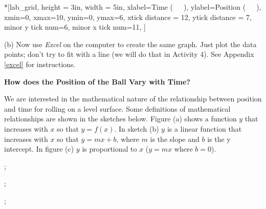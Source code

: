 \begin{lab_axis}*[lab_grid,
	height = {3in},
	width = {5in},
	xlabel={Time (~~~)},
	ylabel={Position (~~~)},
	xmin=0, xmax=10,
	ymin=0, ymax=6,
	xtick distance = 12,
	ytick distance = 7,
	minor y tick num=6,
	minor x tick num=11,
	]
\end{lab_axis}

(b) Now use \textit{Excel} on the computer to create the same graph. Just plot the 
data points; don't try to fit with a line (we will do that in Activity 4). 
See Appendix \ref{excel} for instructions.

\textbf{How does the Position of the Ball Vary with Time?} 

We are interested in the mathematical nature of the relationship between position
and time for rolling on a level surface. Some definitions of mathematical relationships
are shown in the sketches below. Figure (a) shows a function $y$ that increases
with $x$ so that $y = f(x)$. 
In sketch (b) $y$ is a linear function that increases
with $x$ so that $y = mx + b$, where 
$m$ is the slope and $b$ is the y intercept. In
figure (c) $y$ is proportional to $x$ ($y = mx$ where $b = 0$).

\begin{center}
\begin{lab_axis}[lab_noticks_4quads,
	height = {2.2in}, width = {2.2in},
	xlabel={$x$},
	ylabel={$y$},
	title={(a)},
	title style={at={(0,1)}},
	]
;
\end{lab_axis}
\hspace{0.3in}
\begin{lab_axis}[lab_noticks_4quads,
	height = {2.2in}, width = {2.2in},
	xlabel={$x$},
	ylabel={$y$},
	title={(b)},
	title style={at={(0,1)}},
	]
;
\end{lab_axis}
\hspace{0.3in}
\begin{lab_axis}[lab_noticks_4quads,
	height = {2.2in}, width = {2.2in},
	xlabel={$x$},
	ylabel={$y$},
	title={(c)},
	title style={at={(0,1)}},
	]
;
\end{lab_axis}
\end{center}


